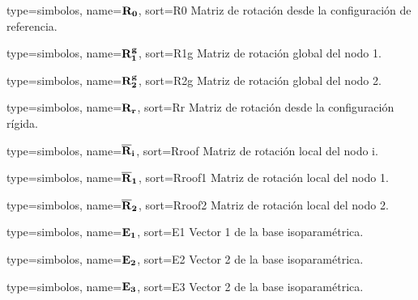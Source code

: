 \setglossarypreamble[simbolos]{}

{
	type={simbolos},
	name={$\bf{R}_0$}, %
	sort={R0} %
}
{Matriz de rotación desde la configuración de referencia.}

{
	type={simbolos},
	name={$\bf{R}_1^g$}, %
	sort={R1g} %
}
{Matriz de rotación global del nodo 1.}

{
	type={simbolos},
	name={$\bf{R}_2^g$}, %
	sort={R2g} %
}
{Matriz de rotación global del nodo 2.}

{
	type={simbolos},
	name={$\bf{R}_r$}, %
	sort={Rr} %
}
{Matriz de rotación desde la configuración rígida.}


{
	type={simbolos},
	name={$\bf{\overline{R}}_i$}, %
	sort={Rroof} %
}
{Matriz de rotación local del nodo i.}


{
	type={simbolos},
	name={$\bf{\overline{R}}_1$}, %
	sort={Rroof1} %
}
{Matriz de rotación local del nodo 1.}

{
	type={simbolos},
	name={$\bf{\overline{R}}_2$}, %
	sort={Rroof2} %
}
{Matriz de rotación local del nodo 2.}

{
	type={simbolos},
	name={$\bf{E_1}$}, %
	sort={E1} %
}
{Vector 1 de la base isoparamétrica.}

{
	type={simbolos},
	name={$\bf{E_2}$}, %
	sort={E2} %
}
{Vector 2 de la base isoparamétrica.}

{
	type={simbolos},
	name={$\bf{E_3}$}, %
	sort={E3} %
}
{Vector 2 de la base isoparamétrica.}

